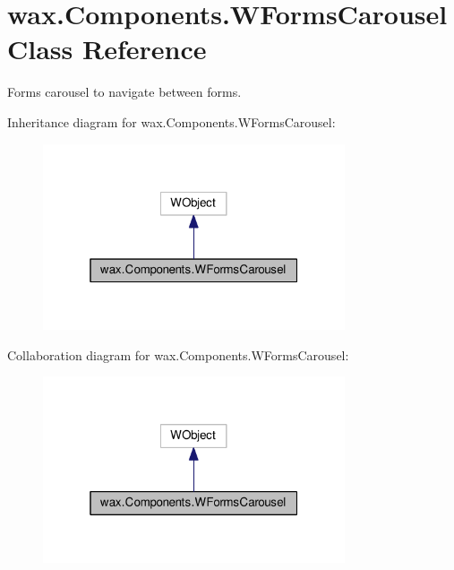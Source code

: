 \hypertarget{classwax_1_1Components_1_1WFormsCarousel}{}\section{wax.\+Components.\+W\+Forms\+Carousel Class Reference}
\label{classwax_1_1Components_1_1WFormsCarousel}


Forms carousel to navigate between forms.  




Inheritance diagram for wax.\+Components.\+W\+Forms\+Carousel\+:
\nopagebreak
\begin{figure}[H]
\begin{center}
\leavevmode
\includegraphics[width=253pt]{classwax_1_1Components_1_1WFormsCarousel__inherit__graph}
\end{center}
\end{figure}


Collaboration diagram for wax.\+Components.\+W\+Forms\+Carousel\+:
\nopagebreak
\begin{figure}[H]
\begin{center}
\leavevmode
\includegraphics[width=253pt]{classwax_1_1Components_1_1WFormsCarousel__coll__graph}
\end{center}
\end{figure}

